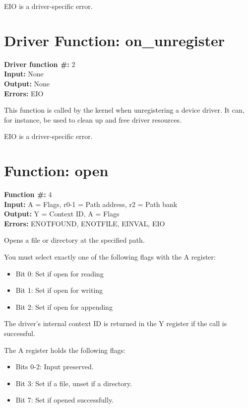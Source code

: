 EIO is a driver-specific error.


\section{Driver Function: on\_unregister}

\textbf{Driver function \#:} 2 \\
\textbf{Input:} None \\
\textbf{Output:} None  \\
\textbf{Errors:} EIO

This function is called by the kernel when unregistering a device driver. It can,
for instance, be used to clean up and free driver resources.

EIO is a driver-specific error.


\section{Function: open}

\textbf{Function \#:} 4 \\
\textbf{Input:} A = Flags, r0-1 = Path address, r2 = Path bank \\
\textbf{Output:} Y = Context ID, A = Flags \\
\textbf{Errors:} ENOTFOUND, ENOTFILE, EINVAL, EIO

Opens a file or directory at the specified path.

You must select exactly one of the following flags with
the A register:

\begin{itemize}
    \item Bit 0: Set if open for reading
    \item Bit 1: Set if open for writing
    \item Bit 2: Set if open for appending
\end{itemize}

The driver's internal context ID is returned in the Y register if the call is successful. 

The A register holds the following flags:

\begin{itemize}
    \item Bits 0-2: Input preserved.
    \item Bit 3: Set if a file, unset if a directory.
    \item Bit 7: Set if opened successfully.
\end{itemize}

